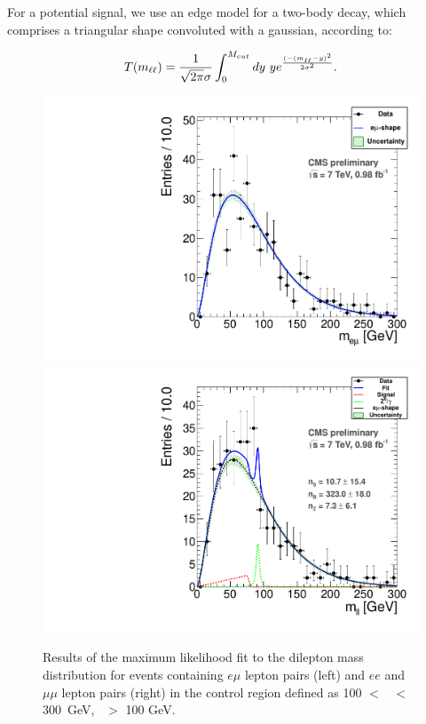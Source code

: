 For a potential signal, we use an edge model for a two-body decay, which comprises a triangular shape convoluted with a gaussian,
according to:

\begin{equation}
T(m_{\ell\ell}) = \frac{1}{\sqrt{2\pi}\sigma}\int_0^{M_{cut}} dy~y e^{\frac{(-(m_{\ell\ell}-y)^2}{2\sigma^2}}. 
\end{equation}

\begin{figure}[hbt]
\begin{center}
\includegraphics[width=0.48\linewidth]{plots_final/fit2011OFOS_Control_Data.pdf}
\includegraphics[width=0.48\linewidth]{plots_final/fit2011_Control_Data.pdf}
\caption{\label{fig:dilmasscontrol}\protect 
Results of the maximum likelihood fit to the dilepton mass distribution for events containing 
$e\mu$ lepton pairs (left) and $ee$ and $\mu\mu$ lepton pairs (right) in the control
region defined as 100 $<$ \Ht\ $<$ 300~GeV, \MET\ $>$ 100 GeV.
}
\end{center}
\end{figure}

